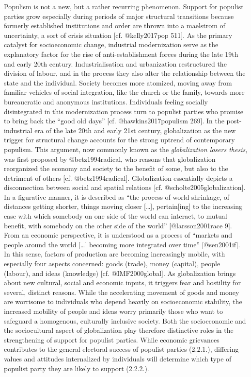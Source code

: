 \documentclass[]{article}
\begin{document}
Populism is not a new, but a rather recurring phenomenon. Support for
populist parties grow especially during periods of major structural
transitions because formerly established institutions and order are
thrown into a maelstrom of uncertainty, a sort of crisis situation
{[}cf. @kelly2017pop 511{]}. As the primary catalyst for socioeconomic
change, industrial modernization serve as the explanatory factor for the
rise of anti-establishment forces during the late 19th and early 20th
century. Industrialisation and urbanization restructured the division of
labour, and in the process they also alter the relationship between the
state and the individual. Society becomes more atomized, moving away
from familiar vehicles of social integration, like the church or the
family, towards more bureaucratic and anonymous institutions.
Individuals feeling socially disintegrated in this modernization process
turn to populist parties who promise to bring back the ``good old days''
{[}cf. @hawkins2017populism 269{]}. In the post-industrial era of the
late 20th and early 21st century, globalization as the new trigger for
structural change accounts for the strong uptrend of contemporary
populism. This argument, now commonly known as the \emph{globalization
losers thesis}, was first proposed by @betz1994radical, who reasons that
globalization reorganized the economy and society to the benefit of
some, but also to the detriment of others {[}cf. @betz1994radical{]}.
Globalization essentially depicts a disconnection between social and
spatial relations {[}cf. @scholte2005globalization{]}. In a figurative
manner, it is described as ``the process of world shrinkage, of
distances getting shorter, things moving closer {[}\ldots{}{]},
pertain{[}ing{]} to the increasing ease with which somebody on one side
of the world can interact, to mutual benefit, with somebody on the other
side of the world'' {[}@larsson2001race 9{]}. From an economic
perspective, it is understood as a process of ``markets and people
around the world {[}\ldots{}{]} becoming more integrated over time''
{[}@sen2001if{]}. In this sense, factors of production are becoming
increasingly mobile, with especially four aspects concerned: goods
(trade), money (capital), people (labour), and ideas (knowledge) {[}cf.
@IMF2000global{]}. As globalization brings about new cultural, social
and economic inputs, it triggers fear and hostility for several,
distinct reasons. While the accelerating movement of goods and money are
worrisome to individuals who depend heavily on socioeconomic stability,
the increased mobility of people and ideas worry primarily those who
want to safeguard a homogenous, culturally inclusive society. Both the
socioeconomic and the sociocultural aspect of globalization play
therefore distinctive roles in the strengthening of support for populist
parties. While economic grievances contributes to the general electoral
success of populist parties (2.2.1.), differing values and attitudes
internalized by individuals will determine which type of populist party
they are likely to support (2.2.2.).
\end{document}
